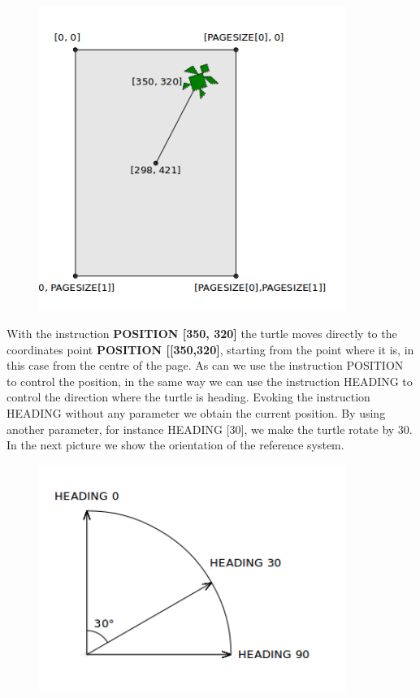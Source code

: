 \vskip 1cm

\begin{figure}[H]
   \centering
   \includegraphics[width=10.0cm,trim=8 8 8 8,clip]{./images/disegnare/disegnare-31.png}
   \label{dis-31}
\end{figure}

\vskip 1cm

With the instruction \textbf{POSITION [350, 320]} the turtle moves directly to the coordinates point \textbf{POSITION [[350,320]}, 
starting from the point where it is, in this case from the centre of the page.
As can we use the instruction POSITION to control the position, in the same way we can use the instruction HEADING to control the direction where the turtle is heading. Evoking the instruction HEADING without any parameter we obtain the  current position.
By using another parameter, for instance HEADING [30], we make the turtle rotate by 30\degree. 
In the next picture we show the orientation of the reference system.

\vskip 1cm

\begin{figure}[H]
   \centering
   \includegraphics[width=10.0cm,trim=8 8 8 8,clip]{./images/disegnare/disegnare-32.png}
   \label{dis-32}
\end{figure}

